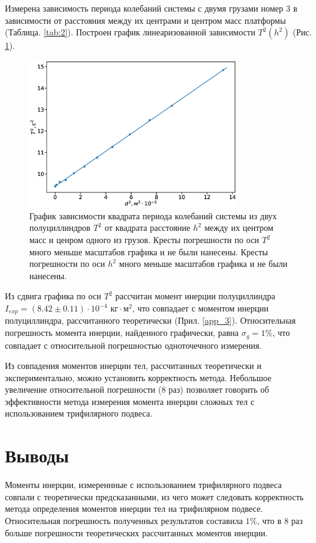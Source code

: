 \documentclass[12pt]{article}
\begin{document}
Измерена зависимость периода колебаний системы с двумя грузами номер 3 в зависимости от расстояния между их центрами и центром масс 
платформы (Таблица. \ref{tab:2}). Построен график линеаризованной зависимости $T^2(h^2)$ (Рис. \ref{fig:4}).

\begin{figure}
    \begin{center}
        \includegraphics[width=0.8\textwidth]{1.eps}
    \end{center}
    \caption{График зависимости квадрата периода колебаний системы из двух полуциллиндров $T^2$ от квадрата расстояние $h^2$ между их центром масс
    и ценром одного из грузов. Кресты погрешности по оси $T^2$ много меньше масштабов графика и не были нанесены. 
    Кресты погрешности по оси $h^2$ много меньше масштабов графика и не были нанесены.}
    \label{fig:4}
\end{figure}

Из сдвига графика по оси $T^2$ рассчитан момент инерции полуциллиндра $I_{exp} = (8.42 \pm 0.11) \cdot 10^{-4}\textrm{ кг}\cdot\textrm{м}^2$, 
что совпадает с моментом инерции полуциллиндра, рассчитанного теоретически (Прил. \ref{app_3}). Относительная погрешность момента инерции, найденного графически,
равна $\sigma_g = 1\%$, что совпадает с относительной погрешностью одноточечного измерения.

Из совпадения моментов инерции тел, рассчитанных теоретически и экспериментально, можно установить корректность метода. Небольшое увеличение 
относительной погрешности (8 раз) позволяет говорить об эффективности метода измерения момента инерции сложных тел с использованием трифилярного 
подвеса.

\section{Выводы}
Моменты инерции, измереннные с использованием трифилярного подвеса совпали с теоретически предсказанными, из чего может следовать корректность
метода определения моментов инерции тел на трифилярном подвесе. Относительная погрешность полученных результатов составила $1\%$, что в 8 раз 
больше погрешности теоретических рассчитанных моментов инерции.
\end{document}
